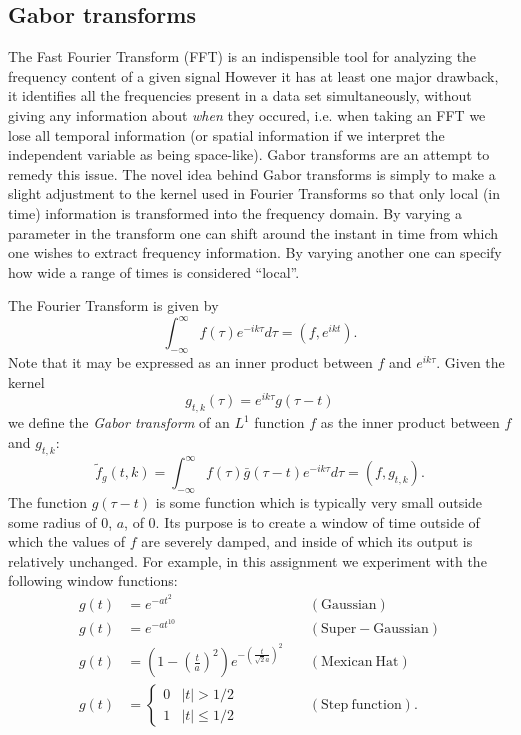 \documentclass[fleqn,10pt]{../SelfArx} %
\begin{document}
\subsection{Gabor transforms}
The Fast Fourier Transform (FFT) is an indispensible tool for analyzing the frequency content of a given signal However it has at least one major drawback, it identifies all the frequencies present in a data set simultaneously, without giving any information about \textit{when} they occured, i.e. when taking an FFT we lose all temporal information (or spatial information if we interpret the independent variable as being space-like). Gabor transforms are an attempt to remedy this issue. The novel idea behind Gabor transforms is simply to make a slight adjustment to the kernel used in Fourier Transforms so that only local (in time) information is transformed into the frequency domain. By varying a parameter in the transform one can shift around the instant in time from which one wishes to extract frequency information. By varying another one can specify how wide a range of times is considered ``local''.

The Fourier Transform is given by
\begin{equation}
	\int^\infty_{-\infty}f(\tau)e^{-ik\tau}d\tau = (f,e^{ikt}).
\end{equation}
Note that it may be expressed as an inner product between $f$ and $e^{ik\tau}$. Given the kernel
\begin{equation}
	g_{t,k}(\tau) = e^{ik\tau}g(\tau-t)
\end{equation}
we define the \textit{Gabor transform} of an $L^1$ function $f$ as the inner product between $f$ and $g_{t,k}$:
\begin{equation}
	\tilde f_g(t,k) = \int^\infty_{-\infty}f(\tau)\bar g(\tau-t)e^{-ik\tau}d\tau = (f,g_{t,k}).
\end{equation}
The function $g(\tau-t)$ is some function which is typically very small outside some radius of 0, $a$, of $0$. Its purpose is to create a window of time outside of which the values of $f$ are severely damped, and inside of which its output is relatively unchanged. For example, in this assignment we experiment with the following window functions:
\begin{align}
	g(t) &= e^{-at^2} &\quad \mathrm{(Gaussian)} \\
	g(t) &= e^{-at^{10}} &\quad \mathrm{(Super-Gaussian)} \\
	g(t) &= \left(1-\left(\frac{t}{a}\right)^2\right)e^{-\left(\frac{t}{\sqrt{2}a}\right)^2} &\quad \mathrm{(Mexican~Hat)} \\
	g(t) &= 
				\begin{cases}
					0 & |t|>1/2 \\
					1 & |t|\leq 1/2
				\end{cases}	&\quad \mathrm{(Step~function)}.
\end{align}
\end{document}
